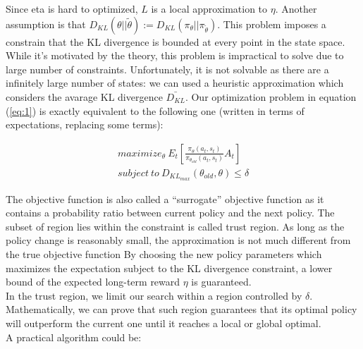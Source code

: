 \documentclass[11pt]{article}
\begin{document}
Since eta is hard to optimized, $L$ is a local approximation to $\eta$. Another
assumption is that $D_{KL}(\theta|| \tilde{\theta}) :=
D_{KL}(\pi_{\theta}||\pi_{\tilde{\theta}})$. This problem imposes a constrain that the KL
divergence is bounded at every point in the state space. While it's motivated by the
theory, this problem is impractical to solve due to large number of constraints.
Unfortunately, it is not solvable as there are a infinitely large number of
states: we can used a heuristic approximation which considers the avarage KL
divergence $\bar{D_{KL}}$. Our optimization problem in equation (\ref{eq:1}) is exactly
equivalent to the following one (written in terms of expectations, replacing some terms):

\begin{equation}
        \begin{split}
        maximize_{\theta} \ E_t[\frac{\pi_{\theta}(a_t, s_t)}{\pi_{\theta_{old}}(a_t, s_t)}A_t]
        \\ \label{eq:2}
        subject \  to \ D_{KL_{max}}(\theta_{old}, \theta) \leq \delta
        \end{split}
\end{equation}

The objective function is also called a “surrogate” objective function as it contains a
probability ratio between current policy and the next policy. The subset of region lies
within the constraint is called trust region. As long as the policy change is reasonably
small, the approximation is not much different from the true objective function By
choosing the new policy parameters which maximizes the expectation subject to the KL
divergence constraint, a lower bound of the expected long-term reward $\eta$ is guaranteed.
\\
In the trust region, we limit our search within a region controlled by $\delta$.
Mathematically, we can prove that such region guarantees that its optimal policy will
outperform the current one until it reaches a local or global optimal.
\\
A practical algorithm could be:
\end{document}
